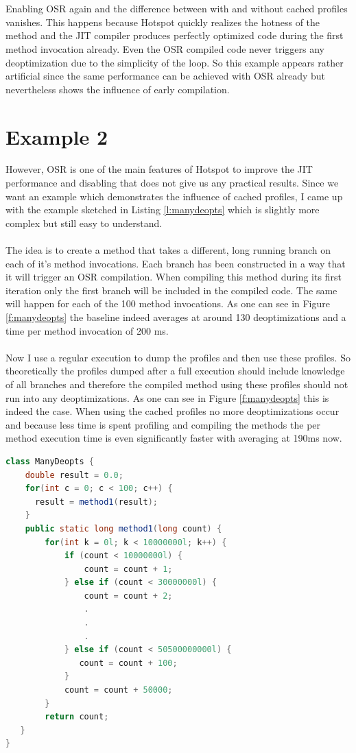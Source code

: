 \\\\
Enabling OSR again and the difference between with and without cached profiles vanishes.
This happens because Hotspot quickly realizes the hotness of the method and the JIT compiler produces perfectly optimized code during the first method invocation already. 
Even the OSR compiled code never triggers any deoptimization due to the simplicity of the loop.
So this example appears rather artificial since the same performance can be achieved with OSR already but nevertheless shows the influence of early compilation.
\section{Example 2}
\label{s:ex2}
However, OSR is one of the main features of Hotspot to improve the JIT performance and disabling that does not give us any practical results. Since we want an example which demonstrates the influence of cached profiles, I came up with the example sketched in Listing \ref{l:manydeopts} which is slightly more complex but still easy to understand.
\\\\
The idea is to create a method that takes a different, long running branch on each of it's method invocations. Each branch has been constructed in a way that it will trigger an OSR compilation. When compiling this method during its first iteration only the first branch will be included in the compiled code. The same will happen for each of the 100 method invocations. As one can see in Figure \ref{f:manydeopts} the baseline indeed averages at around 130 deoptimizations and a time per method invocation of 200 ms.
\\\\
Now I use a regular execution to dump the profiles and then use these profiles. So theoretically the profiles dumped after a full execution should include knowledge of all branches and therefore the compiled method using these profiles should not run into any deoptimizations. As one can see in Figure \ref{f:manydeopts} this is indeed the case. When using the cached profiles no more deoptimizations occur and because less time is spent profiling and compiling the methods the per method execution time is even significantly faster with averaging at 190ms now.
\begin{lstlisting}[float,caption=Simple method that causes many deoptimizations,label=l:manydeopts,language=Java]
class ManyDeopts {
    double result = 0.0;
    for(int c = 0; c < 100; c++) {
      result = method1(result);
    }
    public static long method1(long count) {
        for(int k = 0l; k < 10000000l; k++) {
            if (count < 10000000l) {
                count = count + 1;
            } else if (count < 30000000l) {
                count = count + 2;
                .
                .
                .
            } else if (count < 50500000000l) {
               count = count + 100;
            }
            count = count + 50000;
        }
        return count;
   }
}
\end{lstlisting}
